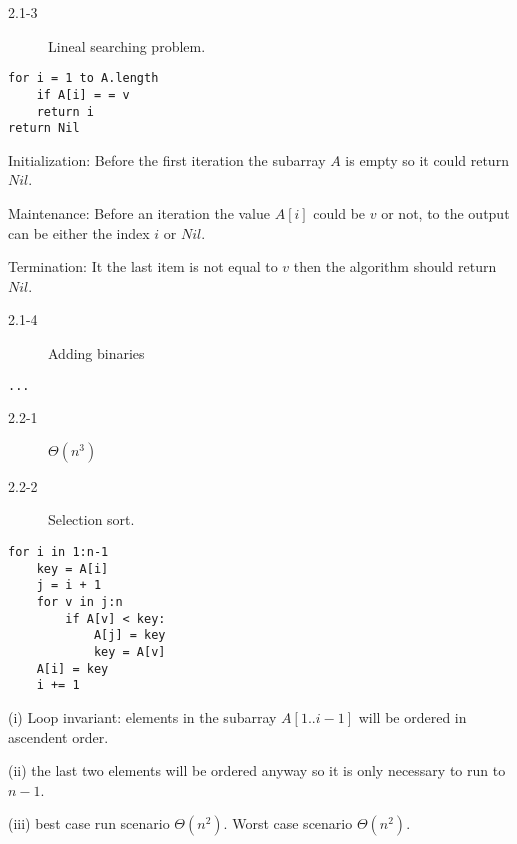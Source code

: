 \begin{description}
 \item[2.1-3] Lineal searching problem.
\end{description}

\begin{lstlisting}
for i = 1 to A.length
    if A[i] = = v
	return i
return Nil
\end{lstlisting}

\begin{list}{}{}
 \item[Initialization:] Before the first iteration the subarray $A$ is empty so it could return $Nil$.
 \item[Maintenance:] Before an iteration the value $A[i]$ could be $v$ or not, to the output can be either the index $i$ or $Nil$.
 \item[Termination:] It the last item is not equal to $v$ then the algorithm should return $Nil$.
\end{list}

\begin{description}
 \item[2.1-4] Adding binaries
\end{description}
\begin{lstlisting}
...
\end{lstlisting}


\begin{description}
 \item[2.2-1] $\Theta$$(n^3)$
\end{description}

\begin{description}
 \item[2.2-2] Selection sort.
\end{description}

\begin{lstlisting}
for i in 1:n-1
    key = A[i]
    j = i + 1
    for v in j:n
        if A[v] < key:
            A[j] = key
            key = A[v]
    A[i] = key
    i += 1
\end{lstlisting}

\begin{description}
 \item (i) Loop invariant: elements in the subarray $A[1..i-1]$ will be ordered in ascendent order.
 \item (ii) the last two elements will be ordered anyway so it is only necessary to run to $n-1$.
 \item (iii) best case run scenario $\Theta$$(n^2)$. Worst case scenario $\Theta$$(n^2)$.
\end{description}


